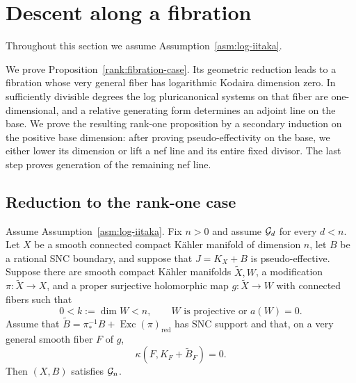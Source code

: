 \section{Descent along a fibration}
\label{sec:rank-one}

Throughout this section we assume Assumption~\ref{asm:log-iitaka}.

We prove Proposition~\ref{rank:fibration-case}.  Its geometric reduction
leads to a fibration whose very general fiber has logarithmic Kodaira
dimension zero.  In sufficiently divisible degrees the log pluricanonical
systems on that fiber are one-dimensional, and a relative generating form
determines an adjoint line on the base.  We prove the resulting rank-one
proposition by a secondary induction on the positive base dimension: after proving
pseudo-effectivity on the base, we either lower its dimension or lift a nef
line and its entire fixed divisor.  The last step proves generation of the
remaining nef line.

\subsection{Reduction to the rank-one case}

\begin{proposition}
\label{rank:rank-one}
Assume Assumption~\ref{asm:log-iitaka}.  Fix \(n>0\) and assume
\(\mathcal G_d\) for every \(d<n\).
Let \(X\) be a smooth connected compact Kähler manifold of dimension \(n\),
let \(B\) be a rational SNC boundary, and suppose that
\(J=K_X+B\) is pseudo-effective.  Suppose there are smooth compact Kähler
manifolds \(\widetilde X,W\), a modification
\(\pi:\widetilde X\to X\), and a proper surjective holomorphic map
\(g:\widetilde X\to W\) with connected fibers such that
\[
 0<k:=\dim W<n,\qquad
 W\text{ is projective or }a(W)=0.
\]
Assume that
\(\widetilde B=\pi_*^{-1}B+\operatorname{Exc}(\pi)_{\mathrm{red}}\)
has SNC support and that, on a very general smooth fiber \(F\) of \(g\),
\[
             \kappa(F,K_F+\widetilde B_F)=0.
\]
Then \((X,B)\) satisfies \(\mathcal G_n\).
\end{proposition}

